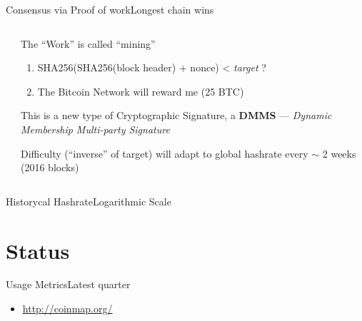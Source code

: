 \documentclass[english,compress]{beamer}
\begin{document}
\begin{frame}{Consensus via Proof of work}{Longest chain wins}
 \begin{columns}
  \begin{column}{0.5 \textwidth}
  \end{column}
  \begin{column}{0.4 \textwidth}
   \begin{exampleblock}{\begin{scriptsize}The ``Work'' is called ``mining'' \end{scriptsize}}
     \begin{scriptsize}
      \begin{enumerate}
       \item SHA256(SHA256(block header) + nonce) < \emph{target} ?
       \item The Bitcoin Network will reward me (25 BTC)
       \end{enumerate}
       \end{scriptsize}
\begin{tiny}
       This is a new type of Cryptographic Signature, a \textbf{DMMS} ---  \emph{Dynamic Membership Multi-party Signature}
     
     
       Difficulty (``inverse'' of target) will adapt to global hashrate
       every $\sim$ 2 weeks (2016 blocks)
      \end{tiny}


   \end{exampleblock}
   \vfill
  \end{column}
  \hfill
 \end{columns}
\end{frame}

\begin{frame}{Historycal Hashrate}{Logarithmic Scale}
\end{frame}



\section{Status}

\begin{frame}{Usage Metrics}{Latest quarter}
\begin{itemize}
 \item \url{http://coinmap.org/} 
\end{itemize}
\end{frame}
\end{document}
